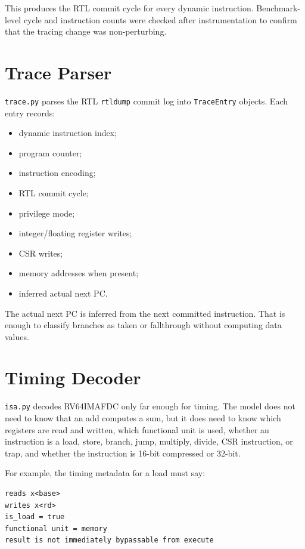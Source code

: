 \documentclass[11pt]{article}
\begin{document}
This produces the RTL commit cycle for every dynamic instruction. Benchmark-level
cycle and instruction counts were checked after instrumentation to confirm that
the tracing change was non-perturbing.

\section{Trace Parser}

\texttt{trace.py} parses the RTL \texttt{rtldump} commit log into
\texttt{TraceEntry} objects. Each entry records:

\begin{itemize}
  \item dynamic instruction index;
  \item program counter;
  \item instruction encoding;
  \item RTL commit cycle;
  \item privilege mode;
  \item integer/floating register writes;
  \item CSR writes;
  \item memory addresses when present;
  \item inferred actual next PC.
\end{itemize}

The actual next PC is inferred from the next committed instruction. That is enough
to classify branches as taken or fallthrough without computing data values.

\section{Timing Decoder}

\texttt{isa.py} decodes RV64IMAFDC only far enough for timing. The model does not
need to know that an add computes a sum, but it does need to know which registers
are read and written, which functional unit is used, whether an instruction is a
load, store, branch, jump, multiply, divide, CSR instruction, or trap, and whether
the instruction is 16-bit compressed or 32-bit.

For example, the timing metadata for a load must say:

\begin{verbatim}
reads x<base>
writes x<rd>
is_load = true
functional unit = memory
result is not immediately bypassable from execute
\end{verbatim}
\end{document}
